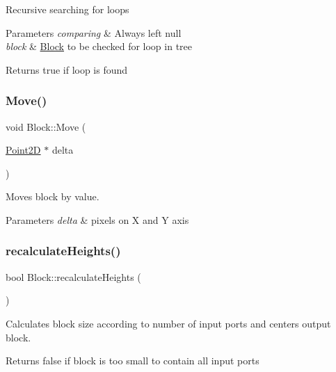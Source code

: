 Recursive searching for loops 
\begin{DoxyParams}{Parameters}
{\em comparing} & Always left null \\
\hline
{\em block} & \hyperlink{classBlock}{Block} to be checked for loop in tree \\
\hline
\end{DoxyParams}
\begin{DoxyReturn}{Returns}
true if loop is found 
\end{DoxyReturn}
\mbox{\label{classBlock_a6e2da20e7645ed07ff449256fc2cc767}} 
\subsubsection{\texorpdfstring{Move()}{Move()}}
{\footnotesize\ttfamily void Block\+::\+Move (\begin{DoxyParamCaption}\item[{\hyperlink{classPoint2D}{Point2D} $\ast$}]{delta }\end{DoxyParamCaption})}

Moves block by value.


\begin{DoxyParams}{Parameters}
{\em delta} & pixels on X and Y axis \\
\hline
\end{DoxyParams}
\mbox{\label{classBlock_a3d65e76b1404d38e68243e50034d5551}} 
\subsubsection{\texorpdfstring{recalculate\+Heights()}{recalculateHeights()}}
{\footnotesize\ttfamily bool Block\+::recalculate\+Heights (\begin{DoxyParamCaption}{ }\end{DoxyParamCaption})\hspace{0.3cm}{\ttfamily [private]}}

Calculates block size according to number of input ports and centers output block. \begin{DoxyReturn}{Returns}
false if block is too small to contain all input ports 
\end{DoxyReturn}
\mbox{\label{classBlock_a88a3549580bb9504230921c8d10ca9dd}} 
